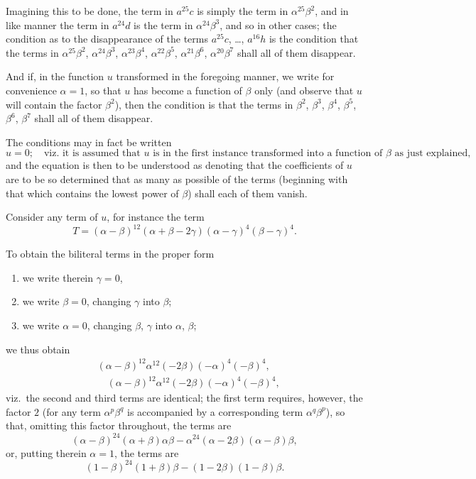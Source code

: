 \documentclass[11pt,a4paper]{book}
\begin{document}
Imagining this to be done, the term in $a^{25}c$ is simply the term in $\alpha^{25}\beta^2$, and in like manner the term in $a^{24}d$ is the term in $\alpha^{24}\beta^3$, and so in other cases; the condition as to the disappearance of the terms $a^{25}c$, \ldots, $a^{16}h$ is the condition that the terms in $\alpha^{25}\beta^2$, $\alpha^{24}\beta^3$, $\alpha^{23}\beta^4$, $\alpha^{22}\beta^5$, $\alpha^{21}\beta^6$, $\alpha^{20}\beta^7$ shall all of them disappear.

And if, in the function $u$ transformed in the foregoing manner, we write for convenience $\alpha = 1$, so that $u$ has become a function of $\beta$ only (and observe that $u$ will contain the factor $\beta^2$), then the condition is that the terms in $\beta^2$, $\beta^3$, $\beta^4$, $\beta^5$, $\beta^6$, $\beta^7$ shall all of them disappear.

The conditions may in fact be written
\[
u = 0; \quad \text{viz.\ it is assumed that $u$ is in the first instance transformed into a function of $\beta$ as just explained,}
\]
and the equation is then to be understood as denoting that the coefficients of $u$ are to be so determined that as many as possible of the terms (beginning with that which contains the lowest power of $\beta$) shall each of them vanish.

Consider any term of $u$, for instance the term
\[
T = (\alpha - \beta)^{12}(\alpha + \beta - 2\gamma)(\alpha - \gamma)^4(\beta - \gamma)^4.
\]

To obtain the biliteral terms in the proper form
\begin{enumerate}[label=\arabic*.]
\item we write therein $\gamma = 0$,
\item we write $\beta = 0$, changing $\gamma$ into $\beta$;
\item we write $\alpha = 0$, changing $\beta$, $\gamma$ into $\alpha$, $\beta$;
\end{enumerate}
we thus obtain
\begin{align*}
&(\alpha - \beta)^{12} \alpha^{12} (-2\beta)(-\alpha)^4(-\beta)^4,\\
&\quad (\alpha - \beta)^{12} \alpha^{12} (-2\beta)(-\alpha)^4(-\beta)^4,
\end{align*}
viz.\ the second and third terms are identical; the first term requires, however, the factor $2$ (for any term $\alpha^p\beta^q$ is accompanied by a corresponding term $\alpha^q\beta^p$), so that, omitting this factor throughout, the terms are
\[
(\alpha - \beta)^{24}(\alpha + \beta)\alpha\beta - \alpha^{24}(\alpha - 2\beta)(\alpha - \beta)\beta,
\]
or, putting therein $\alpha = 1$, the terms are
\[
(1 - \beta)^{24}(1 + \beta)\beta - (1 - 2\beta)(1 - \beta)\beta.
\]
\end{document}

